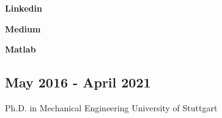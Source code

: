 \documentclass{mycv}
\begin{document}
\begin{paracol}{2}
        \begin{minipage}[c]{0.31\textwidth}
            \begin{flushright}
                {\bfseries Linkedin}\\
                {\footnotesize
                    \href{https://linkedin.com/in/gnanasambandhamc}{}}
            \end{flushright}
        \end{minipage}
        \begin{minipage}{0.05\textwidth}
            \linkedinIcon
        \end{minipage}
        \vspace{3mm}

        \begin{minipage}[c]{0.31\textwidth}
            \begin{flushright}
                {\bfseries Medium}\\
                {\footnotesize \href{https://chandramoulig.medium.com}{}}
            \end{flushright}
        \end{minipage}
        \begin{minipage}{0.05\textwidth}
            \mediumIcon
        \end{minipage}
        \vspace{3mm}

        \begin{minipage}[c]{0.31\textwidth}
            \begin{flushright}
                {\bfseries Matlab}\\
                {\footnotesize
                    \href{https://de.mathworks.com/matlabcentral/profile/authors/4267772}{}}
            \end{flushright}
        \end{minipage}
        \begin{minipage}{0.05\textwidth}
            \matlabIcon
        \end{minipage}

\switchcolumn
{}
\subsection{May 2016 - April 2021}{Ph.D. in Mechanical Engineering}
        {University of Stuttgart}\\


\end{paracol}
\end{document}
